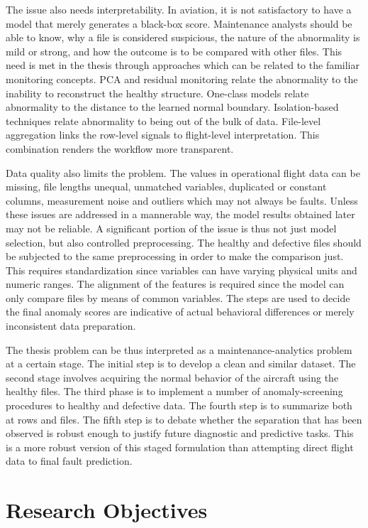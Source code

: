 \documentclass[12pt,a4paper]{report}
\begin{document}
	The issue also needs interpretability. In aviation, it is not satisfactory to have a model that merely generates a black-box score. Maintenance analysts should be able to know, why a file is considered suspicious, the nature of the abnormality is mild or strong, and how the outcome is to be compared with other files. This need is met in the thesis through approaches which can be related to the familiar monitoring concepts. PCA and residual monitoring relate the abnormality to the inability to reconstruct the healthy structure. One-class models relate abnormality to the distance to the learned normal boundary. Isolation-based techniques relate abnormality to being out of the bulk of data. File-level aggregation links the row-level signals to flight-level interpretation. This combination renders the workflow more transparent.
	
	Data quality also limits the problem. The values in operational flight data can be missing, file lengths unequal, unmatched variables, duplicated or constant columns, measurement noise and outliers which may not always be faults. Unless these issues are addressed in a mannerable way, the model results obtained later may not be reliable. A significant portion of the issue is thus not just model selection, but also controlled preprocessing. The healthy and defective files should be subjected to the same preprocessing in order to make the comparison just. This requires standardization since variables can have varying physical units and numeric ranges. The alignment of the features is required since the model can only compare files by means of common variables. The steps are used to decide the final anomaly scores are indicative of actual behavioral differences or merely inconsistent data preparation.
	
	The thesis problem can be thus interpreted as a maintenance-analytics problem at a certain stage. The initial step is to develop a clean and similar dataset. The second stage involves acquiring the normal behavior of the aircraft using the healthy files. The third phase is to implement a number of anomaly-screening procedures to healthy and defective data. The fourth step is to summarize both at rows and files. The fifth step is to debate whether the separation that has been observed is robust enough to justify future diagnostic and predictive tasks. This is a more robust version of this staged formulation than attempting direct flight data to final fault prediction.
	
	\section{Research Objectives}
	
\end{document}
